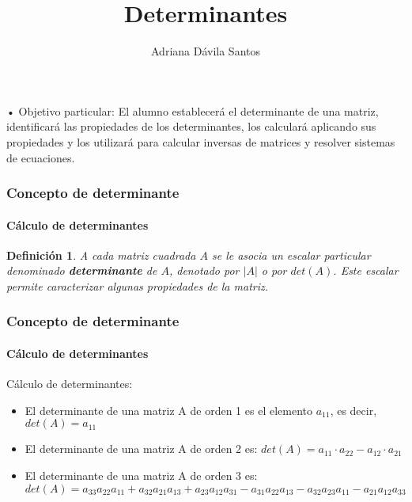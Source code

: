 \documentclass[11pt]{beamer}
\author{Adriana Dávila Santos}
\title{Determinantes}
\newtheorem{defi}{Definición}
\begin{document}
\begin{frame}
\titlepage
\end{frame}


\begin{frame}{• Objetivo particular: }
El alumno establecerá el determinante de una matriz, identificará las propiedades de los
determinantes, los calculará aplicando sus propiedades y los utilizará para calcular inversas de
matrices y resolver sistemas de ecuaciones.
\end{frame}

\begin{frame}
\frametitle{Concepto de determinante}
\framesubtitle{Cálculo de determinantes}
\begin{defi}
A cada matriz cuadrada $A$ se le asocia un escalar particular denominado \textbf{determinante} de $A$, denotado por $|A|$ o por $det(A)$. Este escalar permite caracterizar algunas propiedades de la matriz.
\end{defi}
\end{frame}

\begin{frame}
\frametitle{Concepto de determinante}
\framesubtitle{Cálculo de determinantes}
Cálculo de determinantes:\\
\begin{itemize}
\item El determinante de una matriz A de orden 1 es el elemento $a_{11}$, es decir, $det(A)=a_{11}$
\item El determinante de una matriz A de orden 2 es: $det(A) = a_{11}\cdot a_{22} - a_{12}\cdot a_{21}$
\item El determinante de una matriz A de orden 3 es: 
$det(A) = a_{33}a_{22}a_{11}+a_{32}a_{21}a_{13}+a_{23}a_{12}a_{31}-a_{31}a_{22}a_{13}-a_{32}a_{23}a_{11}-a_{21}a_{12}a_{33}$
\end{itemize}
\end{frame}
\end{document}
